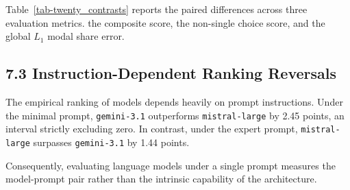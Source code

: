 Table~\ref{tab-twenty_contrasts} reports the paired differences across three evaluation metrics. the composite score, the non-single choice score, and the global $L_1$ modal share error.

\subsection{7.3 Instruction-Dependent Ranking Reversals}

The empirical ranking of models depends heavily on prompt instructions. Under the minimal prompt, \texttt{gemini-3.1} outperforms \texttt{mistral-large} by 2.45 points, an interval strictly excluding zero. In contrast, under the expert prompt, \texttt{mistral-large} surpasses \texttt{gemini-3.1} by 1.44 points.

Consequently, evaluating language models under a single prompt measures the model-prompt pair rather than the intrinsic capability of the architecture.
